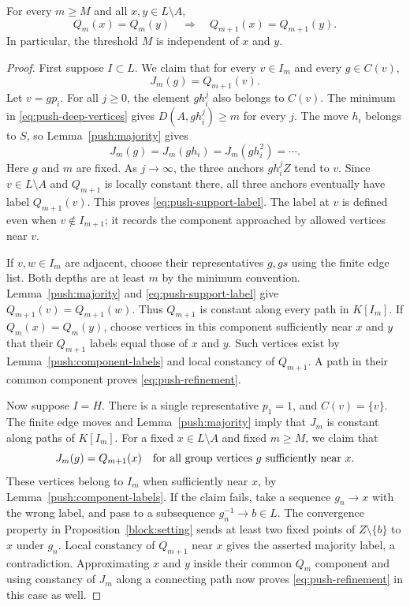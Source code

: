 \begin{lemma}\label{push:refinement}
For every $m\ge M$ and all $x,y\in L\setminus A$,
\begin{equation}\label{eq:push-refinement}
 Q_m(x)=Q_m(y)\quad\Longrightarrow\quad
 Q_{m+1}(x)=Q_{m+1}(y).
\end{equation}
In particular, the threshold $M$ is independent of $x$ and $y$.
\end{lemma}
\begin{proof}
First suppose $I\subset L$.
We claim that for every $v\in I_m$ and every $g\in C(v)$,
\begin{equation}\label{eq:push-support-label}
 J_m(g)=Q_{m+1}(v).
\end{equation}
Let $v=gp_i$.
For all $j\ge0$, the element $gh_i^j$ also belongs to $C(v)$.
The minimum in \eqref{eq:push-deep-vertices} gives
$D(A,gh_i^j)\ge m$ for every $j$.
The move $h_i$ belongs to $S$, so Lemma~\ref{push:majority} gives
\[
 J_m(g)=J_m(gh_i)=J_m(gh_i^2)=\cdots.
\]
Here $g$ and $m$ are fixed.
As $j\to\infty$, the three anchors $gh_i^jZ$ tend to $v$.
Since $v\in L\setminus A$ and $Q_{m+1}$ is locally constant there,
all three anchors eventually have label $Q_{m+1}(v)$.
This proves \eqref{eq:push-support-label}.
The label at $v$ is defined even when $v\notin I_{m+1}$;
it records the component approached by allowed vertices near $v$.

If $v,w\in I_m$ are adjacent, choose their representatives $g,gs$
using the finite edge list.
Both depths are at least $m$ by the minimum convention.
Lemma~\ref{push:majority} and \eqref{eq:push-support-label} give
$Q_{m+1}(v)=Q_{m+1}(w)$.
Thus $Q_{m+1}$ is constant along every path in $K[I_m]$.
If $Q_m(x)=Q_m(y)$, choose vertices in this component sufficiently near
$x$ and $y$ that their $Q_{m+1}$ labels equal those of $x$ and $y$.
Such vertices exist by Lemma~\ref{push:component-labels} and local
constancy of $Q_{m+1}$.
A path in their common component proves
\eqref{eq:push-refinement}.

Now suppose $I=H$.
There is a single representative $p_1=1$, and $C(v)=\{v\}$.
The finite edge moves and Lemma~\ref{push:majority} imply that $J_m$
is constant along paths of $K[I_m]$.
For a fixed $x\in L\setminus A$ and fixed $m\ge M$, we claim that
\[
 J_m(g)=Q_{m+1}(x)
 \quad\hbox{for all group vertices $g$ sufficiently near $x$}.
\]
These vertices belong to $I_m$ when sufficiently near $x$, by
Lemma~\ref{push:component-labels}.
If the claim fails, take a sequence $g_n\to x$ with the wrong label,
and pass to a subsequence $g_n^{-1}\to b\in L$.
The convergence property in Proposition~\ref{block:setting} sends at
least two fixed points of $Z\setminus\{b\}$ to $x$ under $g_n$.
Local constancy of $Q_{m+1}$ near $x$ gives the asserted majority label,
a contradiction.
Approximating $x$ and $y$ inside their common $Q_m$ component and using
constancy of $J_m$ along a connecting path now proves
\eqref{eq:push-refinement} in this case as well.
\end{proof}


